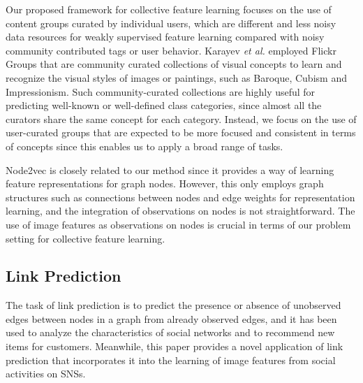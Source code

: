 \documentclass[letterpaper]{article} %
\def\etal{\emph{et al.}}
\begin{document}
Our proposed framework for collective feature learning focuses on the use of content groups curated by individual users, which are different and less noisy data resources for weakly supervised feature learning compared with noisy community contributed tags or user behavior.
Karayev \etal \cite{Karayev2014} employed Flickr Groups that are community curated collections of visual concepts to learn and recognize the visual styles of images or paintings, such as Baroque, Cubism and Impressionism.
Such community-curated collections are highly useful for predicting well-known or well-defined class categories, since almost all the curators share the same concept for each category.
Instead, we focus on the use of user-curated groups that are expected to be more focused and consistent in terms of concepts since this enables us to apply a broad range of tasks.

Node2vec \cite{Grover2016} is closely related to our method since it provides a way of learning feature representations for graph nodes.
However, this only employs graph structures such as connections between nodes and edge weights for representation learning, and the integration of observations on nodes is not straightforward.
The use of image features as observations on nodes is crucial in terms of our problem setting for collective feature learning.

\subsection{Link Prediction}
\label{sec:related:link}
\indent

The task of link prediction is to predict the presence or absence of unobserved edges between nodes in a graph from already observed edges, and it has been used to analyze the characteristics of social networks and to recommend new items for customers.
Meanwhile, this paper provides a novel application of link prediction that incorporates it into the learning of image features from social activities on SNSs.
\end{document}
